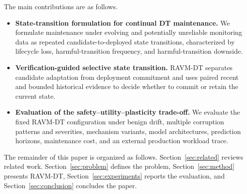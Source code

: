 The main contributions are as follows.
\begin{itemize}
    \item \textbf{State-transition formulation for continual DT maintenance.} We formulate maintenance under evolving and potentially unreliable monitoring data as repeated candidate-to-deployed state transitions, characterized by lifecycle loss, harmful-transition frequency, and harmful-transition downside.
    \item \textbf{Verification-guided selective state transition.} RAVM-DT separates candidate adaptation from deployment commitment and uses paired recent and bounded historical evidence to decide whether to commit or retain the current state.
    \item \textbf{Evaluation of the safety--utility--plasticity trade-off.} We evaluate the fixed RAVM-DT configuration under benign drift, multiple corruption patterns and severities, mechanism variants, model architectures, prediction horizons, maintenance cost, and an external production workload trace.
\end{itemize}

The remainder of this paper is organized as follows. Section~\ref{sec:related} reviews related work. Section~\ref{sec:problem} defines the problem, Section~\ref{sec:method} presents RAVM-DT, Section~\ref{sec:experiments} reports the evaluation, and Section~\ref{sec:conclusion} concludes the paper.
